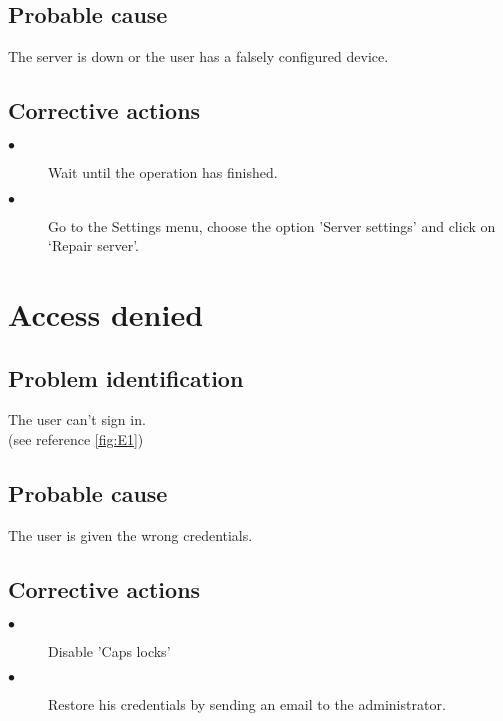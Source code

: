 \subsection{Probable cause}
The server is down or the user has a falsely configured device.

\subsection{Corrective actions}
\begin{description} 
\item[$\bullet$] Wait until the operation has finished.
\item[$\bullet$] Go to the Settings menu, choose the option 'Server settings'
and click on `Repair server'.
\end{description} 

\section{Access denied}

\subsection{Problem identification}
The user can't sign in.\\
(see reference \ref{fig:E1})\\

\subsection{Probable cause}
The user is given the wrong credentials.

\subsection{Corrective actions}
\begin{description} 
\item[$\bullet$] Disable 'Caps locks'
\item[$\bullet$] Restore his credentials by sending an email to the
administrator.
\end{description}